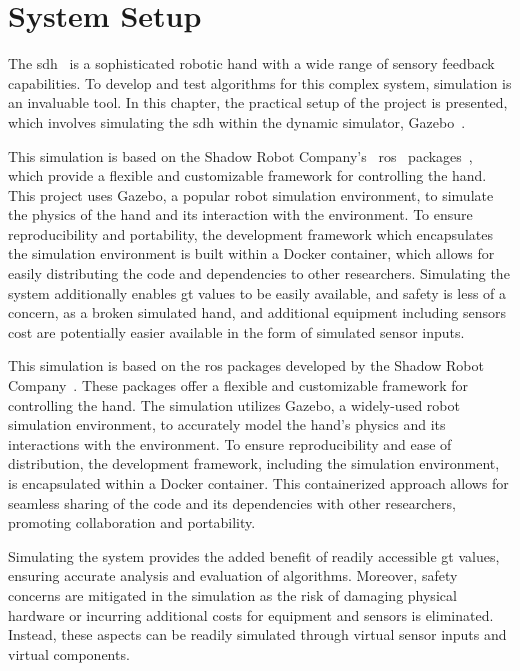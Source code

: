 \chapter{System Setup}\label{ch:system-setup}

The \gls{sdh}~\cite{shadow-dex-hand} is a sophisticated robotic hand with a wide range of sensory feedback capabilities. To develop and test algorithms for this complex system, simulation is an invaluable tool. In this chapter, the practical setup of the project is presented, which involves simulating the \gls{sdh} within the dynamic simulator, Gazebo~\cite{gazebo}. \medskip

This simulation is based on the Shadow Robot Company's~\cite{shadow-robotics} \gls{ros}~\cite{ros} packages~\cite{shadow-ros-packages}, which provide a flexible and customizable framework for controlling the hand. This project uses Gazebo, a popular robot simulation environment, to simulate the physics of the hand and its interaction with the environment. To ensure reproducibility and portability, the development framework which encapsulates the simulation environment is built within a Docker container, which allows for easily distributing the code and dependencies to other researchers. Simulating the system additionally enables \gls{gt} values to be easily available, and safety is less of a concern, as a broken simulated hand, and additional equipment including sensors cost are potentially easier available in the form of simulated sensor inputs. \medskip

This simulation is based on the \gls{ros} packages developed by the Shadow Robot Company~\cite{shadow-robotics, ros, shadow-ros-packages}. These packages offer a flexible and customizable framework for controlling the hand. The simulation utilizes Gazebo, a widely-used robot simulation environment, to accurately model the hand's physics and its interactions with the environment. To ensure reproducibility and ease of distribution, the development framework, including the simulation environment, is encapsulated within a Docker container. This containerized approach allows for seamless sharing of the code and its dependencies with other researchers, promoting collaboration and portability. \medskip

Simulating the system provides the added benefit of readily accessible \gls{gt} values, ensuring accurate analysis and evaluation of algorithms. Moreover, safety concerns are mitigated in the simulation as the risk of damaging physical hardware or incurring additional costs for equipment and sensors is eliminated. Instead, these aspects can be readily simulated through virtual sensor inputs and virtual components. \medskip

